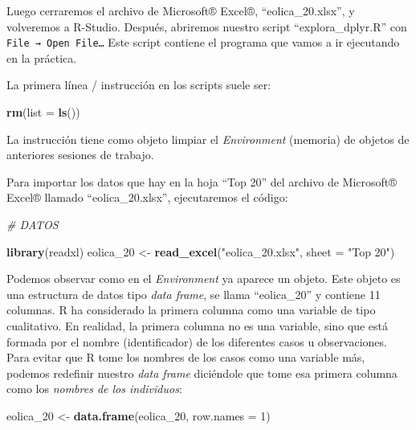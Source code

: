 \documentclass[
]{book}
\newenvironment{Shaded}{\begin{snugshade}}{\end{snugshade}}
\newcommand{\AttributeTok}[1]{\textcolor[rgb]{0.13,0.29,0.53}{#1}}
\newcommand{\CommentTok}[1]{\textcolor[rgb]{0.56,0.35,0.01}{\textit{#1}}}
\newcommand{\DecValTok}[1]{\textcolor[rgb]{0.00,0.00,0.81}{#1}}
\newcommand{\FunctionTok}[1]{\textcolor[rgb]{0.13,0.29,0.53}{\textbf{#1}}}
\newcommand{\NormalTok}[1]{#1}
\newcommand{\OtherTok}[1]{\textcolor[rgb]{0.56,0.35,0.01}{#1}}
\newcommand{\StringTok}[1]{\textcolor[rgb]{0.31,0.60,0.02}{#1}}
\begin{document}
Luego cerraremos el archivo de Microsoft® Excel®, ``eolica\_20.xlsx'', y volveremos a R-Studio. Después, abriremos nuestro script ``explora\_dplyr.R'' con \texttt{File\ →\ Open\ File…} Este script contiene el programa que vamos a ir ejecutando en la práctica.

La primera línea / instrucción en los scripts suele ser:

\begin{Shaded}
\begin{Highlighting}[]
\FunctionTok{rm}\NormalTok{(}\AttributeTok{list =} \FunctionTok{ls}\NormalTok{())}
\end{Highlighting}
\end{Shaded}

La instrucción tiene como objeto limpiar el \emph{Environment} (memoria) de objetos de anteriores sesiones de trabajo.

Para importar los datos que hay en la hoja ``Top 20'' del archivo de Microsoft® Excel® llamado ``eolica\_20.xlsx'', ejecutaremos el código:

\begin{Shaded}
\begin{Highlighting}[]
\CommentTok{\# DATOS}

\FunctionTok{library}\NormalTok{(readxl)}
\NormalTok{eolica\_20 }\OtherTok{\textless{}{-}} \FunctionTok{read\_excel}\NormalTok{(}\StringTok{"eolica\_20.xlsx"}\NormalTok{, }\AttributeTok{sheet =} \StringTok{"Top 20"}\NormalTok{)}
\end{Highlighting}
\end{Shaded}

Podemos observar como en el \emph{Environment} ya aparece un objeto. Este objeto es una estructura de datos tipo \emph{data frame}, se llama ``eolica\_20'' y contiene 11 columnas. R ha considerado la primera columna como una variable de tipo cualitativo. En realidad, la primera columna no es una variable, sino que está formada por el nombre (identificador) de los diferentes casos u observaciones. Para evitar que R tome los nombres de los casos como una variable más, podemos redefinir nuestro \emph{data frame} diciéndole que tome esa primera columna como los \emph{nombres de los individuos}:

\begin{Shaded}
\begin{Highlighting}[]
\NormalTok{eolica\_20 }\OtherTok{\textless{}{-}} \FunctionTok{data.frame}\NormalTok{(eolica\_20, }\AttributeTok{row.names =} \DecValTok{1}\NormalTok{)}
\end{Highlighting}
\end{Shaded}
\end{document}
